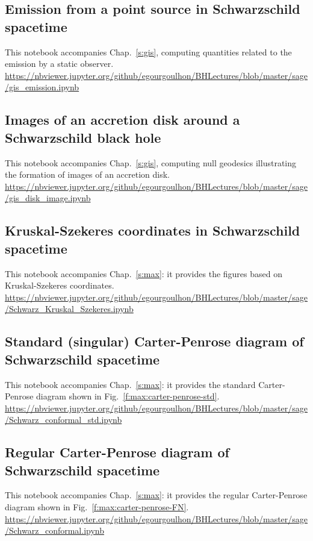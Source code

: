 \subsection{Emission from a point source in Schwarzschild spacetime} \label{s:sam:gis_emission}
%
This notebook accompanies Chap.~\ref{s:gis}, computing quantities related to the
emission by a static observer.\\[1ex]
{\footnotesize
\url{https://nbviewer.jupyter.org/github/egourgoulhon/BHLectures/blob/master/sage/gis_emission.ipynb}
}

\subsection{Images of an accretion disk around a Schwarzschild black hole} \label{s:sam:gis_disk_image}
%
This notebook accompanies Chap.~\ref{s:gis}, computing null geodesics illustrating the formation of images of an accretion disk.\\[1ex]
{\footnotesize
\url{https://nbviewer.jupyter.org/github/egourgoulhon/BHLectures/blob/master/sage/gis_disk_image.ipynb}
}

\subsection{Kruskal-Szekeres coordinates in Schwarzschild spacetime}

This notebook accompanies Chap.~\ref{s:max}: it provides the figures based on
Kruskal-Szekeres coordinates.\\[1ex]
{\footnotesize
\url{https://nbviewer.jupyter.org/github/egourgoulhon/BHLectures/blob/master/sage/Schwarz_Kruskal_Szekeres.ipynb}
}

\subsection{Standard (singular) Carter-Penrose diagram of Schwarzschild spacetime}
\label{s:sam:std_Carter-Penrose}
This notebook accompanies Chap.~\ref{s:max}: it provides the standard
Carter-Penrose diagram shown in Fig.~\ref{f:max:carter-penrose-std}.\\[1ex]
{\footnotesize
\url{https://nbviewer.jupyter.org/github/egourgoulhon/BHLectures/blob/master/sage/Schwarz_conformal_std.ipynb}
}

\subsection{Regular Carter-Penrose diagram of Schwarzschild spacetime}
\label{s:sam:reg_Carter-Penrose}
This notebook accompanies Chap.~\ref{s:max}: it provides the regular
Carter-Penrose diagram shown in Fig.~\ref{f:max:carter-penrose-FN}.\\[1ex]
{\footnotesize
\url{https://nbviewer.jupyter.org/github/egourgoulhon/BHLectures/blob/master/sage/Schwarz_conformal.ipynb}
}

